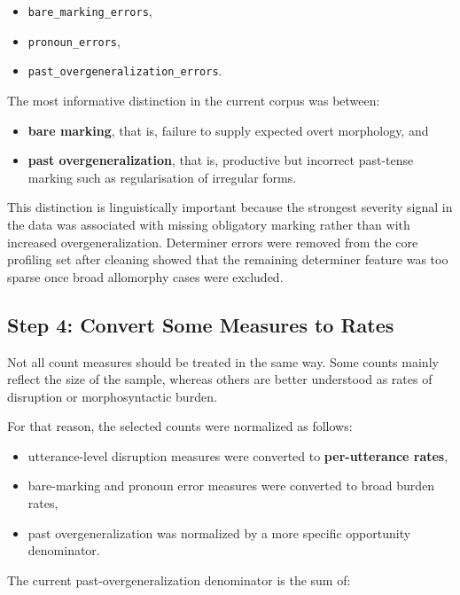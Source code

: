 \begin{itemize}
    \item \texttt{bare\_marking\_errors},
    \item \texttt{pronoun\_errors},
    \item \texttt{past\_overgeneralization\_errors}.
\end{itemize}

The most informative distinction in the current corpus was between:

\begin{itemize}
    \item \textbf{bare marking}, that is, failure to supply expected overt morphology, and
    \item \textbf{past overgeneralization}, that is, productive but incorrect past-tense marking such as regularisation of irregular forms.
\end{itemize}

This distinction is linguistically important because the strongest severity signal in the data was associated with missing obligatory marking rather than with increased overgeneralization. Determiner errors were removed from the core profiling set after cleaning showed that the remaining determiner feature was too sparse once broad allomorphy cases were excluded.

\subsection{Step 4: Convert Some Measures to Rates}

Not all count measures should be treated in the same way. Some counts mainly reflect the size of the sample, whereas others are better understood as rates of disruption or morphosyntactic burden.

For that reason, the selected counts were normalized as follows:

\begin{itemize}
    \item utterance-level disruption measures were converted to \textbf{per-utterance rates},
    \item bare-marking and pronoun error measures were converted to broad burden rates,
    \item past overgeneralization was normalized by a more specific opportunity denominator.
\end{itemize}

The current past-overgeneralization denominator is the sum of:

